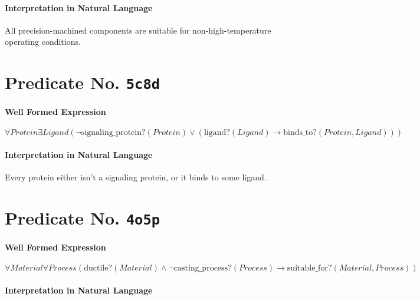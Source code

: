 \documentclass[11pt]{article}
\begin{document}
\paragraph*{Interpretation in Natural Language}
\label{sec:orgb821c40}

All precision-machined components are suitable for non-high-temperature operating conditions.



\section{Predicate No. \texttt{5c8d}}
\label{sec:org111121a}

\paragraph*{Well Formed Expression}
\label{sec:org65f04a2}

\(\forall \mathit{Protein} \exists \mathit{Ligand} (\neg \mathrm{signaling\_protein?}(\mathit{Protein}) \lor (\mathrm{ligand?}(\mathit{Ligand}) \rightarrow \mathrm{binds\_to?}(\mathit{Protein}, \mathit{Ligand})))\)

\paragraph*{Interpretation in Natural Language}
\label{sec:orgc5a8cc7}

Every protein either isn't a signaling protein, or it binds to some ligand.



\section{Predicate No. \texttt{4o5p}}
\label{sec:org9455cbb}

\paragraph*{Well Formed Expression}
\label{sec:orgf06e8d9}

\(\forall \mathit{Material} \forall \mathit{Process} (\mathrm{ductile?}(\mathit{Material}) \land \neg \mathrm{casting\_process?}(\mathit{Process}) \rightarrow \mathrm{suitable\_for?}(\mathit{Material}, \mathit{Process}))\)

\paragraph*{Interpretation in Natural Language}
\label{sec:org9ce9233}
\end{document}
